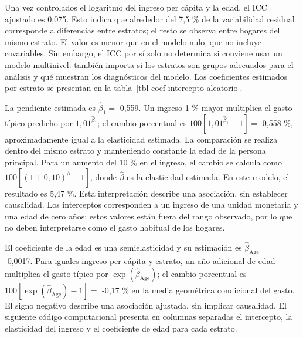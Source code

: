 \documentclass[
  spanish,
  11pt,
  letterpaper,
  oneside,
  open=any]{scrbook}
\newenvironment{Shaded}{\begin{snugshade}}{\end{snugshade}}
\newcommand{\AttributeTok}[1]{\textcolor[rgb]{0.40,0.45,0.13}{#1}}
\newcommand{\DecValTok}[1]{\textcolor[rgb]{0.68,0.00,0.00}{#1}}
\newcommand{\FunctionTok}[1]{\textcolor[rgb]{0.28,0.35,0.67}{#1}}
\newcommand{\NormalTok}[1]{\textcolor[rgb]{0.00,0.23,0.31}{#1}}
\newcommand{\OtherTok}[1]{\textcolor[rgb]{0.00,0.23,0.31}{#1}}
\newcommand{\SpecialCharTok}[1]{\textcolor[rgb]{0.37,0.37,0.37}{#1}}
\newcommand{\StringTok}[1]{\textcolor[rgb]{0.13,0.47,0.30}{#1}}
\begin{document}
Una vez controlados el logaritmo del ingreso per cápita y la edad, el
ICC ajustado es 0,075. Esto indica que alrededor del 7,5 \% de la
variabilidad residual corresponde a diferencias entre estratos; el resto
se observa entre hogares del mismo estrato. El valor es menor que en el
modelo nulo, que no incluye covariables. Sin embargo, el ICC por sí solo
no determina si conviene usar un modelo multinivel: también importa si
los estratos son grupos adecuados para el análisis y qué muestran los
diagnósticos del modelo. Los coeficientes estimados por estrato se
presentan en la tabla~\ref{tbl-coef-intercepto-aleatorio}.

La pendiente estimada es \(\hat\beta_1=\) 0,559. Un ingreso 1 \% mayor
multiplica el gasto típico predicho por \(1{,}01^{\hat\beta_1}\); el
cambio porcentual es \(100[1{,}01^{\hat\beta_1}-1]=\) 0,558 \%,
aproximadamente igual a la elasticidad estimada. La comparación se
realiza dentro del mismo estrato y manteniendo constante la edad de la
persona principal. Para un aumento del 10 \% en el ingreso, el cambio se
calcula como \(100[(1+0,10)^{\hat{\beta}}-1]\), donde \(\hat{\beta}\) es
la elasticidad estimada. En este modelo, el resultado es 5,47 \%. Esta
interpretación describe una asociación, sin establecer causalidad. Los
interceptos corresponden a un ingreso de una unidad monetaria y una edad
de cero años; estos valores están fuera del rango observado, por lo que
no deben interpretarse como el gasto habitual de los hogares.

El coeficiente de la edad es una semielasticidad y su estimación es
\(\hat\beta_{\mathrm{Age}}=\) -0,0017. Para iguales ingreso per cápita y
estrato, un año adicional de edad multiplica el gasto típico por
\(\exp(\hat\beta_{\mathrm{Age}})\); el cambio porcentual es
\(100[\exp(\hat\beta_{\mathrm{Age}})-1]=\) -0,17 \% en la media
geométrica condicional del gasto. El signo negativo describe una
asociación ajustada, sin implicar causalidad. El siguiente código
computacional presenta en columnas separadas el intercepto, la
elasticidad del ingreso y el coeficiente de edad para cada estrato.

\begin{Shaded}
\end{Shaded}
\end{document}
